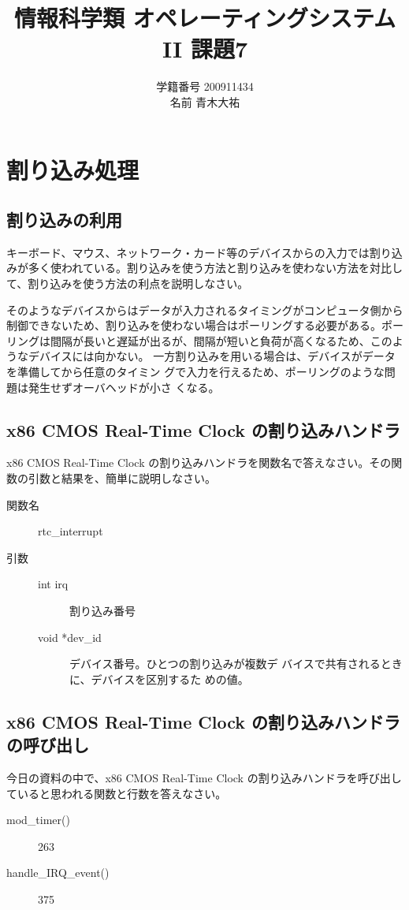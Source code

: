 \documentclass[a4j,9pt]{jsarticle}
\title{情報科学類 オペレーティングシステムII 課題7}
\author{学籍番号 200911434 \\ 名前 青木大祐}
\begin{document}
\maketitle
\setcounter{section}{6}
\section{割り込み処理}
\setcounter{subsection}{700}
\subsection{割り込みの利用}
\begin{screen}
キーボード、マウス、ネットワーク・カード等のデバイスからの入力では割り込みが多く使われている。割り込みを使う方法と割り込みを使わない方法を対比して、割り込みを使う方法の利点を説明しなさい。
\end{screen}
そのようなデバイスからはデータが入力されるタイミングがコンピュータ側から
制御できないため、割り込みを使わない場合はポーリングする必要がある。ポー
リングは間隔が長いと遅延が出るが、間隔が短いと負荷が高くなるため、このよ
うなデバイスには向かない。
一方割り込みを用いる場合は、デバイスがデータを準備してから任意のタイミン
グで入力を行えるため、ポーリングのような問題は発生せずオーバヘッドが小さ
くなる。

\subsection{x86 CMOS Real-Time Clock の割り込みハンドラ}
\begin{screen}
x86 CMOS Real-Time Clock の割り込みハンドラを関数名で答えなさい。その関
 数の引数と結果を、簡単に説明しなさい。
\end{screen}
\begin{description}
 \item[関数名] rtc\_interrupt
 \item[引数] \begin{description}
              \item[int irq] 割り込み番号
              \item[void *dev\_id] \mbox{} デバイス番号。ひとつの割り込みが複数デ
                         バイスで共有されるときに、デバイスを区別するた
                         めの値。
             \end{description}
\end{description}

\subsection{x86 CMOS Real-Time Clock の割り込みハンドラの呼び出し}
\begin{screen}
 今日の資料の中で、x86 CMOS Real-Time Clock の割り込みハンドラを呼び出し
 ていると思われる関数と行数を答えなさい。
\end{screen}

\begin{description}
 \item[mod\_timer()] 263
 \item[handle\_IRQ\_event()] 375
\end{description}
\end{document}
